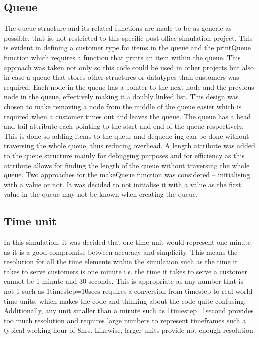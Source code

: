 \documentclass{article}
\begin{document}
\subsection{Queue}
The queue structure and its related functions are made to be as generic as possible, that is, not restricted to this specific post office simulation project. This is evident in defining a customer type for items in the queue and the printQueue function which requires a function that prints an item within the queue. This approach was taken not only so this code could be used in other projects but also in case a queue that stores other structures or datatypes than customers was required.
Each node in the queue has a pointer to the next node and the previous node in the queue, effectively making it a doubly linked list. This design was chosen to make removing a node from the middle of the queue easier which is required when a customer times out and leaves the queue.
The queue has a head and tail attribute each pointing to the start and end of the queue respectively. This is done so adding items to the queue and dequeue-ing can be done without traversing the whole queue, thus reducing overhead.
A length attribute was added to the queue structure mainly for debugging purposes and for efficiency as this attribute allows for finding the length of the queue without traversing the whole queue.
Two approaches for the makeQueue function was considered – initialising with a value or not. It was decided to not initialise it with a value as the first value in the queue may not be known when creating the queue.

\subsection{Time unit}
In this simulation, it was decided that one time unit would represent one minute as it is a good compromise between accuracy and simplicity. This means the resolution for all the time elements within the simulation such as the time it takes to serve customers is one minute i.e. the time it takes to serve a customer cannot be 1 minute and 30 seconds. This is appropriate as any number that is not 1 such as 1timestep=10secs requires a conversion from timestep to real-world time units, which makes the code and thinking about the code quite confusing. Additionally, any unit smaller than a minute such as 1timestep=1second provides too much resolution and requires large numbers to represent timeframes such a typical working hour of 8hrs. Likewise, larger units provide not enough resolution.
\end{document}
